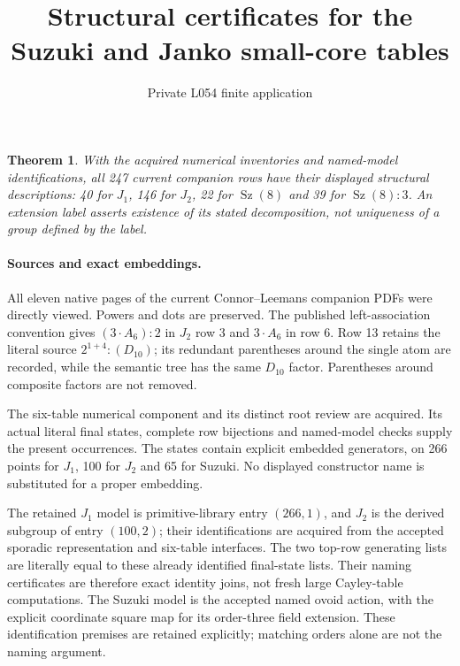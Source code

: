 \documentclass[11pt]{article}
\title{Structural certificates for the Suzuki and Janko small-core tables}
\author{Private L054 finite application}\date{}
\newtheorem{theorem}{Theorem}\newtheorem{lemma}[theorem]{Lemma}
\begin{document}
\maketitle
\begin{theorem}
With the acquired numerical inventories and named-model identifications,
all 247 current companion rows have their displayed structural descriptions:
40 for $J_1$, 146 for $J_2$, 22 for $\operatorname{Sz}(8)$ and 39 for
$\operatorname{Sz}(8):3$. An extension label asserts existence of its
stated decomposition, not uniqueness of a group defined by the label.
\end{theorem}
\paragraph{Sources and exact embeddings.}
All eleven native pages of the current Connor--Leemans companion PDFs were
directly viewed. Powers and dots are preserved. The published left-association
convention gives $(3\mathbin{\cdot}A_6):2$ in $J_2$ row 3 and
$3\mathbin{\cdot}A_6$ in row 6. Row 13 retains the literal source
$2^{1+4}:(D_{10})$; its redundant parentheses around the single atom are
recorded, while the semantic tree has the same $D_{10}$ factor. Parentheses
around composite factors are not removed.

The six-table numerical component and its distinct root review are acquired.
Its actual literal final states, complete row bijections and named-model
checks supply the present occurrences. The states contain explicit embedded
generators, on 266 points for $J_1$, 100 for $J_2$ and 65 for Suzuki.
No displayed constructor name is substituted for a proper embedding.

The retained $J_1$ model is primitive-library entry $(266,1)$, and $J_2$
is the derived subgroup of entry $(100,2)$; their identifications are
acquired from the accepted sporadic representation and six-table interfaces.
The two top-row generating lists are literally equal to these already
identified final-state lists. Their naming certificates are therefore exact
identity joins, not fresh large Cayley-table computations. The Suzuki model
is the accepted named ovoid action, with the explicit coordinate square map
for its order-three field extension. These identification premises are
retained explicitly; matching orders alone are not the naming argument.
\end{document}
